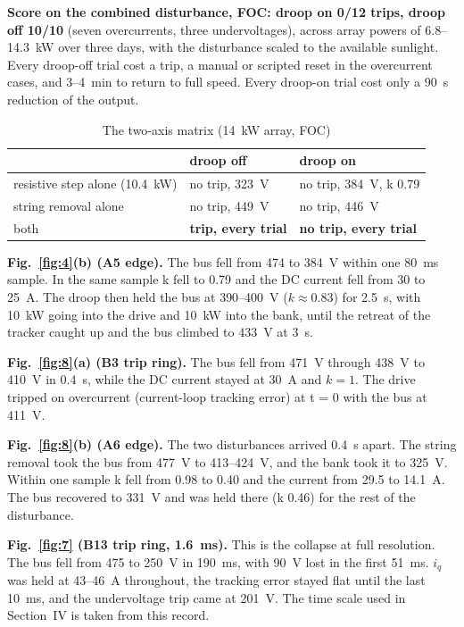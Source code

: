 \documentclass[journal]{IEEEtran}
\begin{document}
\textbf{Score on the combined disturbance, FOC: droop on 0/12 trips, droop off 10/10} (seven overcurrents, three undervoltages), across array powers of 6.8--14.3~kW over three days, with the disturbance scaled to the available sunlight. Every droop-off trial cost a trip, a manual or scripted reset in the overcurrent cases, and 3--4~min to return to full speed. Every droop-on trial cost only a 90~s reduction of the output.

\begin{table}[!t]\caption{The two-axis matrix (14~kW array, FOC)}\label{tab:2}\centering\footnotesize
\begin{tabularx}{\columnwidth}{lXX}\toprule
 & droop off & droop on \\
\midrule
resistive step alone (10.4~kW) & no trip, 323~V & no trip, 384~V, k 0.79 \\
string removal alone & no trip, 449~V & no trip, 446~V \\
both & \textbf{trip, every trial} & \textbf{no trip, every trial} \\
\bottomrule\end{tabularx}\end{table}


\textbf{Fig.~\ref{fig:4}(b) (A5 edge).} The bus fell from 474 to 384~V within one 80~ms sample. In the same sample k fell to 0.79 and the DC current fell from 30 to 25~A. The droop then held the bus at 390--400~V ($k \approx 0.83$) for 2.5~s, with 10~kW going into the drive and 10~kW into the bank, until the retreat of the tracker caught up and the bus climbed to 433~V at 3~s.

\textbf{Fig.~\ref{fig:8}(a) (B3 trip ring).} The bus fell from 471~V through 438~V to 410~V in 0.4~s, while the DC current stayed at 30~A and $k = 1.$ The drive tripped on overcurrent (current-loop tracking error) at t = 0 with the bus at 411~V.

\textbf{Fig.~\ref{fig:8}(b) (A6 edge).} The two disturbances arrived 0.4~s apart. The string removal took the bus from 477~V to 413--424~V, and the bank took it to 325~V. Within one sample k fell from 0.98 to 0.40 and the current from 29.5 to 14.1~A. The bus recovered to 331~V and was held there (k 0.46) for the rest of the disturbance.

\textbf{Fig.~\ref{fig:7} (B13 trip ring, 1.6~ms).} This is the collapse at full resolution. The bus fell from 475 to 250~V in 190~ms, with 90~V lost in the first 51~ms. $i_q$ was held at 43--46~A throughout, the tracking error stayed flat until the last 10~ms, and the undervoltage trip came at 201~V. The time scale used in Section~IV is taken from this record.
\end{document}
